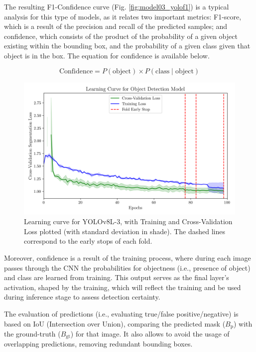 \documentclass[conference]{IEEEtran}
\begin{document}
The resulting F1-Confidence curve (Fig. \ref{fig:model03_yolof1}) is a typical analysis for this type of models, as it relates two important metrics: F1-score, which is a result of the precision and recall of the predicted samples; and confidence, which consists of the product of the probability of a given object existing within the bounding box, and the probability of a given class given that object is in the box. The equation for confidence is available below.

\[
\text{Confidence} = P(\text{object}) \times P(\text{class} \mid \text{object})
\]

\begin{figure}[H]
    \centering
    \includegraphics[width=1\linewidth]{assets/model03_lc.png}
    \caption{Learning curve for YOLOv8L-3, with
Training and Cross-Validation Loss plotted (with standard
deviation in shade). The dashed lines correspond to the early stops of each fold.}
    \label{fig:model03_lc}
\end{figure}





Moreover, confidence is a result of the training process, where during each image passes through the CNN the probabilities for objectness (i.e., presence of object) and class are learned from training. This output serves as the final layer's activation, shaped by the training, which will reflect the training and be used during inference stage to assess detection certainty.

The evaluation of predictions (i.e., evaluating true/false positive/negative) is based on IoU (Intersection over Union), comparing the predicted mask ($B_{\text{p}}$) with the ground-truth ($B_{\text{gt}}$) for that image. It also allows to avoid the usage of overlapping predictions, removing redundant bounding boxes.
\end{document}
